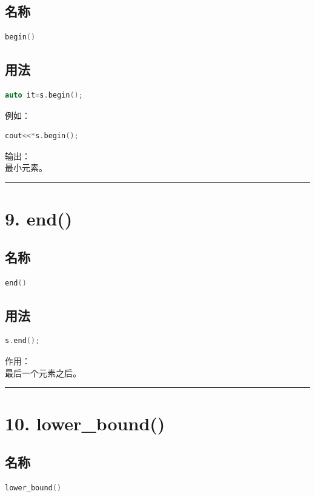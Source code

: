 \documentclass[10pt,twocolumn]{extarticle}
\begin{document}
\subsection{名称}
\begin{lstlisting}[language=C++]
begin()
\end{lstlisting}

\subsection{用法}
\begin{lstlisting}[language=C++]
auto it=s.begin();
\end{lstlisting}
例如：
\begin{lstlisting}[language=C++]
cout<<*s.begin();
\end{lstlisting}
输出：\\
最小元素。

\noindent\rule{\linewidth}{0.4pt}

\section{9. end()}

\subsection{名称}
\begin{lstlisting}[language=C++]
end()
\end{lstlisting}

\subsection{用法}
\begin{lstlisting}[language=C++]
s.end();
\end{lstlisting}
作用：\\
最后一个元素之后。

\noindent\rule{\linewidth}{0.4pt}

\section{10. lower\_bound()}

\subsection{名称}
\begin{lstlisting}[language=C++]
lower_bound()
\end{lstlisting}
\end{document}
